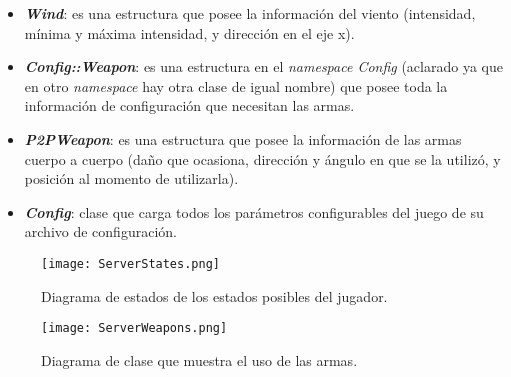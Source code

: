 \begin{itemize}
	\item \textbf{\textit{Wind}}: es una estructura que posee la información del viento (intensidad, mínima y máxima intensidad, y dirección en el eje x).
	
	\item \textbf{\textit{Config::Weapon}}: es una estructura en el \textit{namespace Config} (aclarado ya que en otro \textit{namespace} hay otra clase de igual nombre) que posee toda la información de configuración que necesitan las armas.
	
	\item \textbf{\textit{P2PWeapon}}: es una estructura que posee la información de las armas cuerpo a cuerpo (daño que ocasiona, dirección y ángulo en que se la utilizó, y posición al momento de utilizarla).
	
	\item \textbf{\textit{Config}}: clase que carga todos los parámetros configurables del juego de su archivo de configuración.
\end{itemize}

\begin{sidewaysfigure}[!ht]
	\centering
	\texttt{[image: ServerStates.png]}
	\caption{Diagrama de estados de los estados posibles del jugador.}
	\label{im:serverState}
\end{sidewaysfigure}

\begin{sidewaysfigure}[!ht]
	\centering
	\texttt{[image: ServerWeapons.png]}
	\caption{Diagrama de clase que muestra el uso de las armas.}
	\label{im:serverWeapons}
\end{sidewaysfigure}